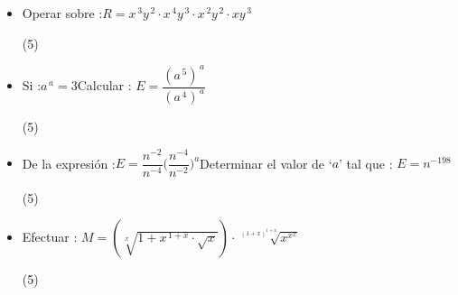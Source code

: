 \documentclass[11pt, twocolumn, landscape, a4paper]{article}
\begin{document}
\begin{itemize}
\item{Operar sobre :\qquad $R = x^{\,3}y^{\,2} \cdot x^{\,4}y^{\,3} \cdot x^{\,2}y^{\,2} \cdot xy^{\,3}$
\begin{tasks}(5)
\end{tasks}
}
\item{Si :\qquad $a^{\,a} = 3$\qquad Calcular : $E = \dfrac{(a^{\,5})^{\,a}}{(a^{\,4})^{\,a}}$ 
\begin{tasks}(5)
\end{tasks}
}
\item{De la expresión :\qquad $E = \dfrac{n^{-2}}{n^{-4}}\Biggl(\dfrac{n^{-4}}{n^{-2}}\Biggl)^{\!a}$\qquad Determinar el valor de `$a$' tal que : $E = n^{-198}$
\begin{tasks}(5)
\end{tasks}
}
\item{Efectuar : \qquad $M = (\sqrt[x]{1 + x^{\,1 + x} \cdot \sqrt{x}}) \cdot \sqrt[(1 + x)^{1 + x}]{x^{x^{x}}}$
\begin{tasks}(5)
\end{tasks}
} 
\end{itemize}
\end{document}
